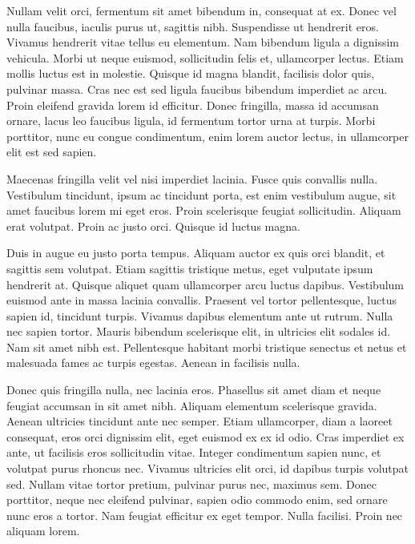 \documentclass[conference]{gds-review}
\begin{document}
Nullam velit orci, fermentum sit amet bibendum in, consequat at ex. Donec vel nulla faucibus, iaculis purus ut, sagittis nibh. Suspendisse ut hendrerit eros. Vivamus hendrerit vitae tellus eu elementum. Nam bibendum ligula a dignissim vehicula. Morbi ut neque euismod, sollicitudin felis et, ullamcorper lectus. Etiam mollis luctus est in molestie. Quisque id magna blandit, facilisis dolor quis, pulvinar massa. Cras nec est sed ligula faucibus bibendum imperdiet ac arcu. Proin eleifend gravida lorem id efficitur. Donec fringilla, massa id accumsan ornare, lacus leo faucibus ligula, id fermentum tortor urna at turpis. Morbi porttitor, nunc eu congue condimentum, enim lorem auctor lectus, in ullamcorper elit est sed sapien. 

Maecenas fringilla velit vel nisi imperdiet lacinia. Fusce quis convallis nulla. Vestibulum tincidunt, ipsum ac tincidunt porta, est enim vestibulum augue, sit amet faucibus lorem mi eget eros. Proin scelerisque feugiat sollicitudin. Aliquam erat volutpat. Proin ac justo orci. Quisque id luctus magna.

Duis in augue eu justo porta tempus. Aliquam auctor ex quis orci blandit, et sagittis sem volutpat. Etiam sagittis tristique metus, eget vulputate ipsum hendrerit at. Quisque aliquet quam ullamcorper arcu luctus dapibus. Vestibulum euismod ante in massa lacinia convallis. Praesent vel tortor pellentesque, luctus sapien id, tincidunt turpis. Vivamus dapibus elementum ante ut rutrum. Nulla nec sapien tortor. Mauris bibendum scelerisque elit, in ultricies elit sodales id. Nam sit amet nibh est. Pellentesque habitant morbi tristique senectus et netus et malesuada fames ac turpis egestas. Aenean in facilisis nulla.

Donec quis fringilla nulla, nec lacinia eros. Phasellus sit amet diam et neque feugiat accumsan in sit amet nibh. Aliquam elementum scelerisque gravida. Aenean ultricies tincidunt ante nec semper. Etiam ullamcorper, diam a laoreet consequat, eros orci dignissim elit, eget euismod ex ex id odio. Cras imperdiet ex ante, ut facilisis eros sollicitudin vitae. Integer condimentum sapien nunc, et volutpat purus rhoncus nec. Vivamus ultricies elit orci, id dapibus turpis volutpat sed. Nullam vitae tortor pretium, pulvinar purus nec, maximus sem. Donec porttitor, neque nec eleifend pulvinar, sapien odio commodo enim, sed ornare nunc eros a tortor. Nam feugiat efficitur ex eget tempor. Nulla facilisi. Proin nec aliquam lorem.
\end{document}

